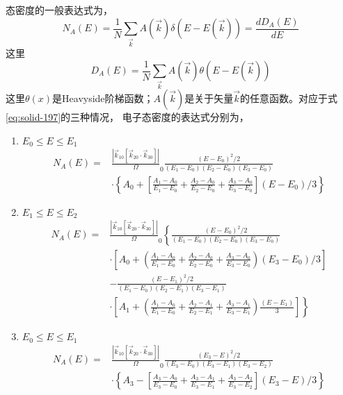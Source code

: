 态密度的一般表达式为，
\begin{equation}
  N_A(E)=\frac1N\sum_{\vec k}A(\vec k)\delta(E-E(\vec k))=\frac{dD_A(E)}{dE}
  \label{eq:solid-198}
\end{equation}
这里
\begin{equation}
  D_A(E)=\frac1N\sum_{\vec k}A(\vec k)\theta(E-E(\vec k))
  \label{eq:solid-199}
\end{equation}
这里$\theta(x)$是Heavyside阶梯函数；$A(\vec k)$是关于矢量$\vec k$的任意函数。对应于式\eqref{eq:solid-197}的三种情况，
电子态密度的表达式分别为，
\begin{enumerate}
\item $E_0\leqslant E\leqslant E_1$
\begin{equation}
  \begin{split}
    N_A(E)=&\frac{|\vec k_{10}[\vec k_{20}\cdot\vec k_{30}]|}\Omega_0\frac{(E-E_0)^2/2}{(E_1-E_0)(E_2-E_0)(E_3-E_0)}\\
    &\cdot\left\{A_0+\left[\frac{A_1-A_0}{E_1-E_0}+\frac{A_2-A_0}{E_2-E_0}+\frac{A_3-A_0}{E_3-E_0}\right](E-E_0)/3\right\}
  \end{split}
  \label{eq:solid-200}
\end{equation}
\item $E_1\leqslant E\leqslant E_2$
\begin{equation}
  \begin{split}
    N_A(E)=&\frac{|\vec k_{10}[\vec k_{20}\cdot\vec k_{30}]|}\Omega_0\left\{\frac{(E-E_0)^2/2}{(E_1-E_0)(E_2-E_0)(E_3-E_0)}\right.\\
    &\cdot\left[A_0+\left(\frac{A_1-A_0}{E_1-E_0}+\frac{A_2-A_0}{E_2-E_0}+\frac{A_3-A_0}{E_3-E_0}\right)(E_3-E_0)/3\right]\\
    &-\frac{(E-E_1)^2/2}{(E_1-E_0)(E_2-E_1)(E_3-E_1)}\\
    &\cdot\left.\left[A_1+\left(\frac{A_1-A_0}{E_1-E_0}+\frac{A_2-A_1}{E_2-E_1}+\frac{A_3-A_1}{E_3-E_1}\right)\frac{(E-E_1)}3\right]\right\}
  \end{split}
  \label{eq:solid-201}
\end{equation}
\item $E_0\leqslant E\leqslant E_1$
\begin{equation}
  \begin{split}
    N_A(E)=&\frac{|\vec k_{10}[\vec k_{20}\cdot\vec k_{30}]|}\Omega_0\frac{(E_3-E)^2/2}{(E_3-E_0)(E_3-E_1)(E_3-E_2)}\\
    &\cdot\left\{A_3-\left[\frac{A_3-A_0}{E_3-E_0}+\frac{A_3-A_1}{E_3-E_1}+\frac{A_3-A_2}{E_3-E_2}\right](E_3-E)/3\right\}
  \end{split}
  \label{eq:solid-202}
\end{equation}
\end{enumerate}

